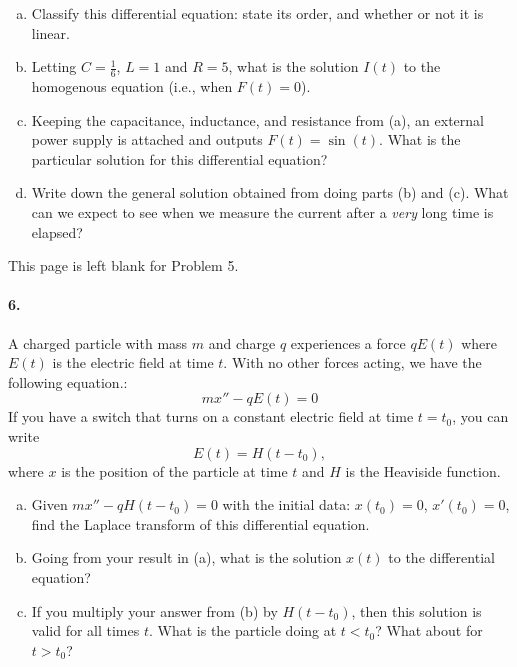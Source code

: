 \documentclass[11pt]{article}
\begin{document}
\begin{enumerate}[(a)]
    \item Classify this differential equation: state its order, and whether or not it is linear.
    \item Letting $C=\frac{1}{6}$, $L=1$ and $R=5$, what is the solution $I(t)$ to the homogenous equation (i.e., when $F(t)=0$).
    \item Keeping the capacitance, inductance, and resistance from (a), an external power supply is attached and outputs $F(t)=\sin(t).$ What is the particular solution for this differential equation?
    \item Write down the general solution obtained from doing parts (b) and (c). What can we expect to see when we measure the current after a \emph{very} long time is elapsed?
    
\end{enumerate}

\newpage
\noindent This page is left blank for Problem 5.


\newpage
\paragraph{6.} A charged particle with mass $m$ and charge $q$ experiences a force $qE(t)$ where $E(t)$ is the electric field at time $t$.  With no other forces acting, we have the following equation.:
\[
mx''- qE(t)=0
\]
If you have a switch that turns on a constant electric field at time $t=t_0$, you can write
\[
E(t)=H(t-t_0), 
\]
where $x$ is the position of the particle at time $t$ and $H$ is the Heaviside function. 

\begin{enumerate}[(a)]
    \item Given $mx''-qH(t-t_0)=0$ with the initial data: $x(t_0)=0$, $x'(t_0)=0$, find the Laplace transform of this differential equation.
    \item Going from your result in (a), what is the solution $x(t)$ to the differential equation?
    \item If you multiply your answer from (b) by $H(t-t_0)$, then this solution is valid for all times $t$.  What is the particle doing at $t<t_0$? What about for $t>t_0$?
\end{enumerate}


\newpage
\thispagestyle{empty}
\end{document}
